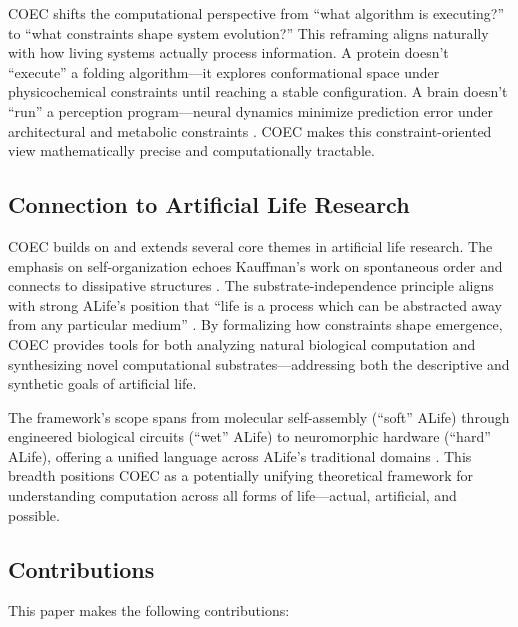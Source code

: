 \documentclass[11pt]{article}
\begin{document}
COEC shifts the computational perspective from ``what algorithm is executing?'' to ``what constraints shape system evolution?'' This reframing aligns naturally with how living systems actually process information. A protein doesn't ``execute'' a folding algorithm—it explores conformational space under physicochemical constraints until reaching a stable configuration. A brain doesn't ``run'' a perception program—neural dynamics minimize prediction error under architectural and metabolic constraints \citep{friston2010free}. COEC makes this constraint-oriented view mathematically precise and computationally tractable.

\subsection{Connection to Artificial Life Research}

COEC builds on and extends several core themes in artificial life research. The emphasis on self-organization echoes Kauffman's work on spontaneous order \citep{kauffman1993origins} and connects to dissipative structures \citep{prigogine1984order}. The substrate-independence principle aligns with strong ALife's position that ``life is a process which can be abstracted away from any particular medium'' \citep{langton1989artificial,bedau2003artificial}. By formalizing how constraints shape emergence, COEC provides tools for both analyzing natural biological computation and synthesizing novel computational substrates—addressing both the descriptive and synthetic goals of artificial life.

The framework's scope spans from molecular self-assembly (``soft'' ALife) through engineered biological circuits (``wet'' ALife) to neuromorphic hardware (``hard'' ALife), offering a unified language across ALife's traditional domains \citep{aguilar2014past}. This breadth positions COEC as a potentially unifying theoretical framework for understanding computation across all forms of life—actual, artificial, and possible.

\subsection{Contributions}

This paper makes the following contributions:
\end{document}
